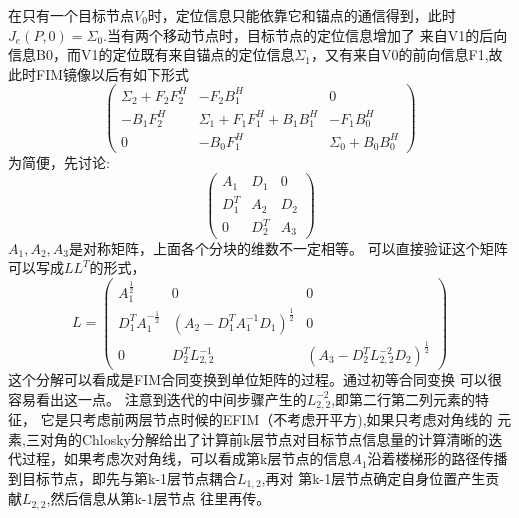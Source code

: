 \documentclass[12pt]{article}
\begin{document}
在只有一个目标节点$V_0$时，定位信息只能依靠它和锚点的通信得到，此时
$J_e(P,0)=\Sigma_0$.当有两个移动节点时，目标节点的定位信息增加了
来自V1的后向信息B0，而V1的定位既有来自锚点的定位信息$\Sigma_1$，又有来自V0的前向信息F1,故此时FIM镜像以后有如下形式
\[
\left(
\begin{array}{ccc}
\Sigma_2+F_2F_2^H & -F_2B_1^H & 0\\
-B_1F_2^H & \Sigma_1+F_1F_1^H+B_1B_1^H & -F_1B_0^H\\
0 & -B_0F_1^H & \Sigma_0+B_0B_0^H 
\end{array}
\right)
\]
为简便，先讨论:
\[
\left(
\begin{array}{ccc}
A_1 & D_1 & 0 \\
D_1^T & A_2 & D_2 \\
0 & D_2^T & A_3
\end{array}
\right)
\]
$A_1,A_2,A_3$是对称矩阵，上面各个分块的维数不一定相等。
可以直接验证这个矩阵可以写成$LL^T$的形式，
\begin{equation}
L=\left(
\begin{array}{ccc}
A_1^{\frac{1}{2}} & 0 & 0 \\
D_1^TA_1^{-\frac{1}{2}} & (A_2-D_1^TA_1^{-1}D_1)^{\frac{1}{2}} & 0 \\
0 & D_2^TL_{2,2}^{-1} & (A_3-D_2^TL_{2,2}^{-2}D_2)^{\frac{1}{2}}
\end{array}
\right)
\end{equation}
这个分解可以看成是FIM合同变换到单位矩阵的过程。通过初等合同变换
可以很容易看出这一点。
注意到迭代的中间步骤产生的$L_{2,2}^{-2}$,即第二行第二列元素的特征，
它是只考虑前两层节点时候的EFIM（不考虑开平方),如果只考虑对角线的
元素,三对角的Chlosky分解给出了计算前k层节点对目标节点信息量的计算清晰的迭代过程，如果考虑次对角线，可以看成第k层节点的信息$A_1$沿着楼梯形的路径传播到目标节点，即先与第k-1层节点耦合$L_{1,2}$,再对
第k-1层节点确定自身位置产生贡献$L_{2,2}$,然后信息从第k-1层节点
往里再传。

\end{document}
